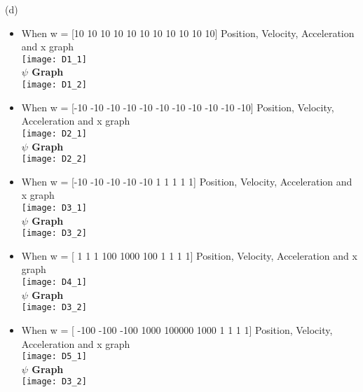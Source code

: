 \documentclass[12pt]{article}
\newenvironment{problem}[2][Problem]{\begin{trivlist}
\item[\hskip \labelsep {\bfseries #1}\hskip \labelsep {\bfseries #2.}]}{\end{trivlist}}
\begin{document}
\begin{problem} 1 (d)
\end{problem}
\begin{Answer}
\begin{itemize}
    \item When w = [10 10 10 10 10 10 10 10 10 10 10]
    Position, Velocity, Acceleration and x graph\\
    \texttt{[image: D1\_1]}\\
    \textbf{$\psi$ Graph}\\
    \texttt{[image: D1\_2]}\\
    \item When w = [-10 -10 -10 -10 -10 -10 -10 -10 -10 -10 -10]
        Position, Velocity, Acceleration and x graph\\
        \texttt{[image: D2\_1]}\\
        \textbf{$\psi$ Graph}\\
    \texttt{[image: D2\_2]}\\
    \item When w = [-10 -10 -10 -10 -10 1 1 1 1 1]
        Position, Velocity, Acceleration and x graph\\
        \texttt{[image: D3\_1]}\\
        \textbf{$\psi$ Graph}\\
    \texttt{[image: D3\_2]}\\ 
    \item When w = [ 1 1 1 100 1000 100 1 1 1 1]
        Position, Velocity, Acceleration and x graph\\
        \texttt{[image: D4\_1]}\\
        \textbf{$\psi$ Graph}\\
    \texttt{[image: D3\_2]}\\
    \item When w =  [ -100 -100 -100 1000 100000 1000 1 1 1 1]
        Position, Velocity, Acceleration and x graph\\
        \texttt{[image: D5\_1]}\\
        \textbf{$\psi$ Graph}\\
    \texttt{[image: D3\_2]}\\
\end{itemize}
\end{Answer}
\end{document}
